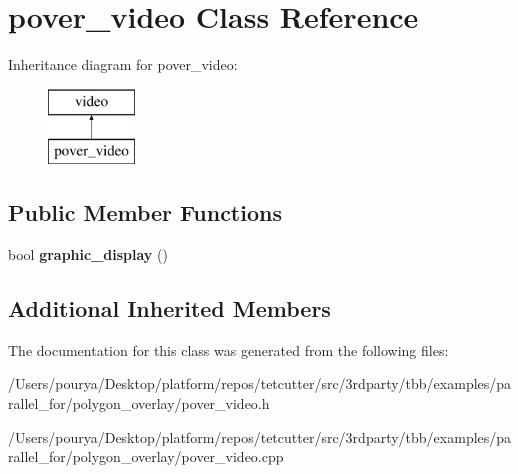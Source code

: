 \hypertarget{classpover__video}{}\section{pover\+\_\+video Class Reference}
\label{classpover__video}
Inheritance diagram for pover\+\_\+video\+:\begin{figure}[H]
\begin{center}
\leavevmode
\includegraphics[height=2.000000cm]{classpover__video}
\end{center}
\end{figure}
\subsection*{Public Member Functions}
\begin{DoxyCompactItemize}
\item 
\hypertarget{classpover__video_ac5c9cbc4c9ff3aa35d6a9bf21b0b4154}{}bool {\bfseries graphic\+\_\+display} ()\label{classpover__video_ac5c9cbc4c9ff3aa35d6a9bf21b0b4154}

\end{DoxyCompactItemize}
\subsection*{Additional Inherited Members}


The documentation for this class was generated from the following files\+:\begin{DoxyCompactItemize}
\item 
/\+Users/pourya/\+Desktop/platform/repos/tetcutter/src/3rdparty/tbb/examples/parallel\+\_\+for/polygon\+\_\+overlay/pover\+\_\+video.\+h\item 
/\+Users/pourya/\+Desktop/platform/repos/tetcutter/src/3rdparty/tbb/examples/parallel\+\_\+for/polygon\+\_\+overlay/pover\+\_\+video.\+cpp\end{DoxyCompactItemize}
